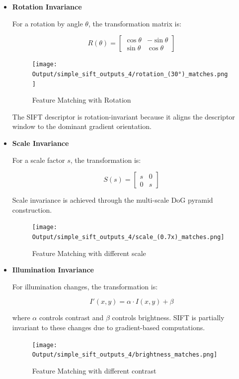 \documentclass[12pt,a4paper]{article}
\begin{document}
\begin{itemize}
    \item \textbf{Rotation Invariance}

    For a rotation by angle $\theta$, the transformation matrix is:
    
    \begin{equation}
    R(\theta) = \begin{bmatrix}
    \cos\theta & -\sin\theta \\
    \sin\theta & \cos\theta
    \end{bmatrix}
    \end{equation}

    \begin{figure}[!ht]
    \centering
    \texttt{[image: Output/simple\_sift\_outputs\_4/rotation\_(30°)\_matches.png]}
    \caption{Feature Matching with Rotation}
    \label{fig:fig7}
\end{figure}

    The SIFT descriptor is rotation-invariant because it aligns the descriptor window to the dominant gradient orientation.
    
    \item \textbf{Scale Invariance}
    
    For a scale factor $s$, the transformation is:
    
    \begin{equation}
    S(s) = \begin{bmatrix}
    s & 0 \\
    0 & s
    \end{bmatrix}
    \end{equation}
    
    Scale invariance is achieved through the multi-scale DoG pyramid construction.

    \begin{figure}[!ht]
    \centering
    \texttt{[image: Output/simple\_sift\_outputs\_4/scale\_(0.7x)\_matches.png]}
    \caption{Feature Matching with different scale}
    \label{fig:fig8}
 \end{figure}
    
    \item \textbf{Illumination Invariance}
    
    For illumination changes, the transformation is:
    
    \begin{equation}
    I'(x,y) = \alpha \cdot I(x,y) + \beta
    \end{equation}
    
    where $\alpha$ controls contrast and $\beta$ controls brightness. SIFT is partially invariant to these changes due to gradient-based computations.

    \begin{figure}[!ht]
    \centering
    \texttt{[image: Output/simple\_sift\_outputs\_4/brightness\_matches.png]}
    \caption{Feature Matching with different contrast}
    \label{fig:fig9}
    \end{figure}
    
\end{itemize}
\end{document}
